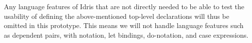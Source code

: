 Any language features of Idris that are not directly needed to be able to test the usability of defining the above-mentioned top-level declarations will thus be omitted in this prototype. This means we will not handle language features such as dependent pairs, with notation,
let bindings, do-notation, and case expressions.
